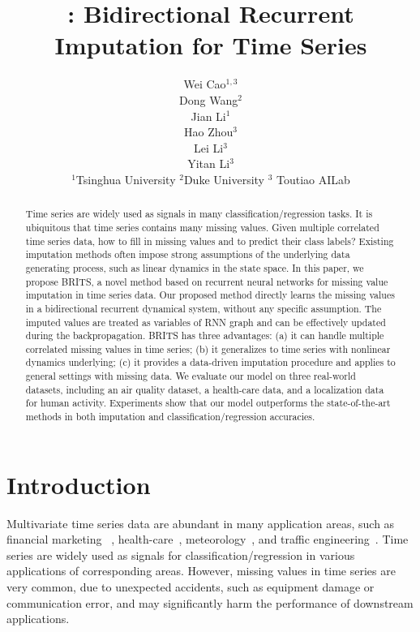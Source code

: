 \documentclass{article}
\title{\methodname: Bidirectional Recurrent Imputation for Time Series}
\author{
Wei Cao$^{1,3}$ \\
\And
Dong Wang$^2$ \\
\And
Jian Li$^1$\\
\And
Hao Zhou$^3$\\
\And
Lei Li$^3$\\
\And
Yitan Li$^3$\\
\AND
$^1$Tsinghua University \quad $^2$Duke University \quad $^3$ Toutiao AILab
}
\newcommand{\methodname}{\xspace{BRITS}}
\begin{document}
\maketitle

\begin{abstract}

Time series are widely used as signals in many classification/regression tasks. It is ubiquitous that time series contains many missing values. Given multiple correlated time series data, how to fill in missing values and to predict their class labels? 
Existing imputation methods often impose strong assumptions of the underlying data generating process, such as linear dynamics in the state space. 
In this paper, we propose \methodname, a novel method based on recurrent neural networks for missing value imputation in time series data. 
Our proposed method directly learns the missing values in a bidirectional recurrent dynamical system, without any specific assumption. The imputed values are treated as variables of RNN graph and can be effectively updated during the backpropagation.
BRITS has three advantages: (a) it can handle multiple correlated missing values in time series; (b) it generalizes to time series with nonlinear dynamics underlying; (c) it provides a data-driven imputation procedure and applies to general settings with missing data.
We evaluate our model on three real-world datasets, including an air quality dataset, a health-care data, and a localization data for human activity.
Experiments show that our model outperforms the state-of-the-art methods in both imputation and classification/regression accuracies. 

\end{abstract} \section{Introduction}
\label{sec:introduction}

Multivariate time series data are abundant in many application areas, such as financial marketing ~\cite{bauer2016arrow,batres2015deep}, health-care~\cite{che2018recurrent,liu2016learning}, meteorology~\cite{xingjian2015convolutional,rani2012recent},
and traffic engineering~\cite{wang2017deepsd,zhang2017deep}.
Time series are widely used as signals for classification/regression in  various applications of corresponding areas.
However, missing values in time series are very common, due to unexpected accidents, such as equipment damage or communication error, and may significantly harm the performance of downstream applications.
\end{document}
